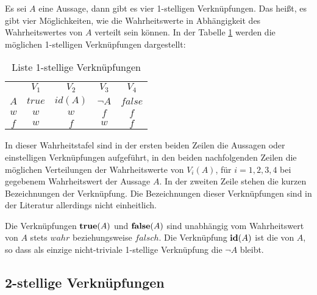 \begin{Unit}
Es sei $A$ eine Aussage, dann gibt es vier 1-stelligen Verknüpfungen. Das 
heißt, es gibt vier Möglichkeiten, wie die Wahrheitswerte in Abhängigkeit 
des Wahrheitswertes von $A$ verteilt sein können. In der Tabelle 
\ref{tbl:Liste 1-stellige Verknüpfungen} werden die möglichen 
1-stelligen Verknüpfungen dargestellt:

\begin{table}[htbp]
\begin{center}
  \begin{tabular}{c||c|c|c|c}
      & $V_1$ & $V_2$ & $V_3$  & $V_4$ \\
    $A$ & $true$  & $id(A)$ & $\neg A$ & $false$ \\  \hline
    $w$ & $w$     & $w$     & $f$      & $f$     \\
    $f$ & $w$     & $f$     & $w$      & $f$     \\
  \end{tabular}
  \caption{Liste 1-stellige Verknüpfungen}
  \label{tbl:Liste 1-stellige Verknüpfungen}
\end{center} 
\end{table}

In dieser Wahrheitstafel sind in der ersten beiden Zeilen die Aussagen oder
einstelligen Verknüpfungen aufgeführt, in den beiden nachfolgenden Zeilen 
die möglichen Verteilungen der Wahrheitswerte von $V_i(A)$, für 
$i = 1, 2, 3, 4$ bei gegebenem Wahrheitswert der Aussage $A$. In der zweiten 
Zeile stehen die kurzen Bezeichnungen der Verknüpfung. Die Bezeichnungen 
dieser Verknüpfungen sind in der Literatur allerdings nicht einheitlich.

Die Verknüpfungen $\Begriff{true}(A)$ und $\Begriff{false}(A)$ sind 
unabhängig vom Wahrheitswert von $A$ stets $wahr$ beziehungsweise $falsch$. 
Die Verknüpfung $\Begriff{id}(A)$ ist die  von $A$, so 
dass als einzige nicht-triviale 1-stellige Verknüpfung die  
$\neg A$ bleibt.
\end{Unit}

\subsection*{2-stellige Verknüpfungen}


